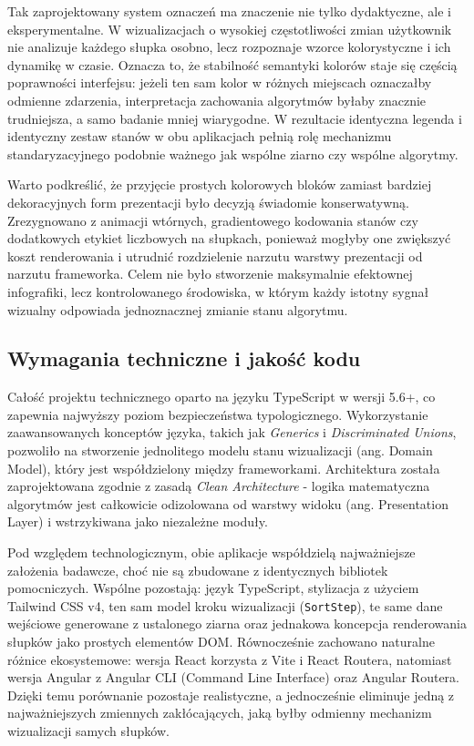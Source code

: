 \documentclass[12pt,openright,twoside]{report}
\begin{document}
  Tak zaprojektowany system oznaczeń ma znaczenie nie tylko dydaktyczne, ale i eksperymentalne. W wizualizacjach o wysokiej częstotliwości zmian użytkownik nie analizuje każdego słupka osobno, lecz rozpoznaje wzorce kolorystyczne i ich dynamikę w czasie. Oznacza to, że stabilność semantyki kolorów staje się częścią poprawności interfejsu: jeżeli ten sam kolor w różnych miejscach oznaczałby odmienne zdarzenia, interpretacja zachowania algorytmów byłaby znacznie trudniejsza, a samo badanie mniej wiarygodne. W rezultacie identyczna legenda i identyczny zestaw stanów w obu aplikacjach pełnią rolę mechanizmu standaryzacyjnego podobnie ważnego jak wspólne ziarno czy wspólne algorytmy.

  Warto podkreślić, że przyjęcie prostych kolorowych bloków zamiast bardziej dekoracyjnych form prezentacji było decyzją świadomie konserwatywną. Zrezygnowano z animacji wtórnych, gradientowego kodowania stanów czy dodatkowych etykiet liczbowych na słupkach, ponieważ mogłyby one zwiększyć koszt renderowania i utrudnić rozdzielenie narzutu warstwy prezentacji od narzutu frameworka. Celem nie było stworzenie maksymalnie efektownej infografiki, lecz kontrolowanego środowiska, w którym każdy istotny sygnał wizualny odpowiada jednoznacznej zmianie stanu algorytmu.

\subsection{Wymagania techniczne i jakość kodu}
Całość projektu technicznego oparto na języku TypeScript w wersji 5.6+, co zapewnia najwyższy poziom bezpieczeństwa typologicznego. Wykorzystanie zaawansowanych konceptów języka, takich jak \textit{Generics} i \textit{Discriminated Unions}, pozwoliło na stworzenie jednolitego modelu stanu wizualizacji (ang. Domain Model), który jest współdzielony między frameworkami. Architektura została zaprojektowana zgodnie z zasadą \textit{Clean Architecture} - logika matematyczna algorytmów jest całkowicie odizolowana od warstwy widoku (ang. Presentation Layer) i wstrzykiwana jako niezależne moduły.

Pod względem technologicznym, obie aplikacje współdzielą najważniejsze założenia badawcze, choć nie są zbudowane z identycznych bibliotek pomocniczych. Wspólne pozostają: język TypeScript, stylizacja z użyciem Tailwind CSS v4, ten sam model kroku wizualizacji (\texttt{SortStep}), te same dane wejściowe generowane z ustalonego ziarna oraz jednakowa koncepcja renderowania słupków jako prostych elementów DOM. Równocześnie zachowano naturalne różnice ekosystemowe: wersja React korzysta z Vite i React Routera, natomiast wersja Angular z Angular CLI (Command Line Interface) oraz Angular Routera. Dzięki temu porównanie pozostaje realistyczne, a jednocześnie eliminuje jedną z najważniejszych zmiennych zakłócających, jaką byłby odmienny mechanizm wizualizacji samych słupków.
\end{document}
